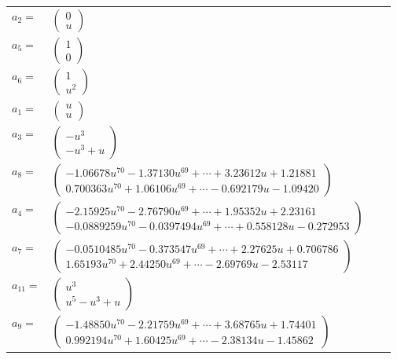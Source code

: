\documentclass[1p]{elsarticle_modified}
\theoremstyle{definition}
\begin{document}
\begin{tabular}{m{7pt} m{180pt} m{7pt} m{180pt} }
\flushright $a_{2}=$&$\begin{pmatrix}0\\u\end{pmatrix}$ \\
\flushright $a_{5}=$&$\begin{pmatrix}1\\0\end{pmatrix}$ \\
\flushright $a_{6}=$&$\begin{pmatrix}1\\u^2\end{pmatrix}$ \\
\flushright $a_{1}=$&$\begin{pmatrix}u\\u\end{pmatrix}$ \\
\flushright $a_{3}=$&$\begin{pmatrix}- u^3\\- u^3+u\end{pmatrix}$ \\
\flushright $a_{8}=$&$\begin{pmatrix}-1.06678 u^{70}-1.37130 u^{69}+\cdots+3.23612 u+1.21881\\0.700363 u^{70}+1.06106 u^{69}+\cdots-0.692179 u-1.09420\end{pmatrix}$ \\
\flushright $a_{4}=$&$\begin{pmatrix}-2.15925 u^{70}-2.76790 u^{69}+\cdots+1.95352 u+2.23161\\-0.0889259 u^{70}-0.0397494 u^{69}+\cdots+0.558128 u-0.272953\end{pmatrix}$ \\
\flushright $a_{7}=$&$\begin{pmatrix}-0.0510485 u^{70}-0.373547 u^{69}+\cdots+2.27625 u+0.706786\\1.65193 u^{70}+2.44250 u^{69}+\cdots-2.69769 u-2.53117\end{pmatrix}$ \\
\flushright $a_{11}=$&$\begin{pmatrix}u^3\\u^5- u^3+u\end{pmatrix}$ \\
\flushright $a_{9}=$&$\begin{pmatrix}-1.48850 u^{70}-2.21759 u^{69}+\cdots+3.68765 u+1.74401\\0.992194 u^{70}+1.60425 u^{69}+\cdots-2.38134 u-1.45862\end{pmatrix}$ \\

\end{tabular}
\end{document}
